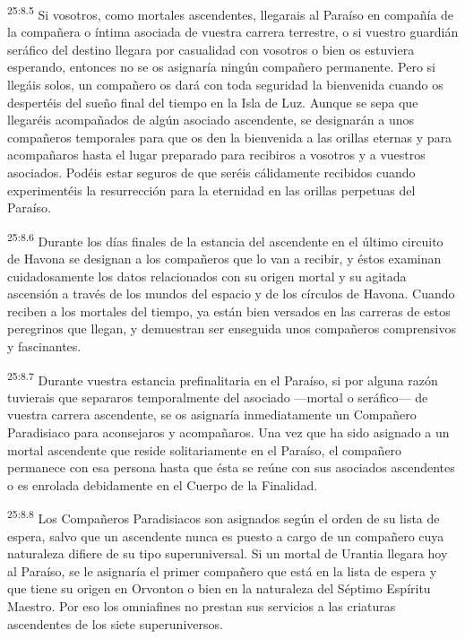 \par
\textsuperscript{25:8.5} Si vosotros, como mortales ascendentes, llegarais al Paraíso en compañía de la compañera o íntima asociada de vuestra carrera terrestre, o si vuestro guardián seráfico del destino llegara por casualidad con vosotros o bien os estuviera esperando, entonces no se os asignaría ningún compañero permanente. Pero si llegáis solos, un compañero os dará con toda seguridad la bienvenida cuando os despertéis del sueño final del tiempo en la Isla de Luz. Aunque se sepa que llegaréis acompañados de algún asociado ascendente, se designarán a unos compañeros temporales para que os den la bienvenida a las orillas eternas y para acompañaros hasta el lugar preparado para recibiros a vosotros y a vuestros asociados. Podéis estar seguros de que seréis cálidamente recibidos cuando experimentéis la resurrección para la eternidad en las orillas perpetuas del Paraíso.

\par
\textsuperscript{25:8.6} Durante los días finales de la estancia del ascendente en el último circuito de Havona se designan a los compañeros que lo van a recibir, y éstos examinan cuidadosamente los datos relacionados con su origen mortal y su agitada ascensión a través de los mundos del espacio y de los círculos de Havona. Cuando reciben a los mortales del tiempo, ya están bien versados en las carreras de estos peregrinos que llegan, y demuestran ser enseguida unos compañeros comprensivos y fascinantes.

\par
\textsuperscript{25:8.7} Durante vuestra estancia prefinalitaria en el Paraíso, si por alguna razón tuvierais que separaros temporalmente del asociado ---mortal o seráfico--- de vuestra carrera ascendente, se os asignaría inmediatamente un Compañero Paradisiaco para aconsejaros y acompañaros. Una vez que ha sido asignado a un mortal ascendente que reside solitariamente en el Paraíso, el compañero permanece con esa persona hasta que ésta se reúne con sus asociados ascendentes o es enrolada debidamente en el Cuerpo de la Finalidad.

\par
\textsuperscript{25:8.8} Los Compañeros Paradisiacos son asignados según el orden de su lista de espera, salvo que un ascendente nunca es puesto a cargo de un compañero cuya naturaleza difiere de su tipo superuniversal. Si un mortal de Urantia llegara hoy al Paraíso, se le asignaría el primer compañero que está en la lista de espera y que tiene su origen en Orvonton o bien en la naturaleza del Séptimo Espíritu Maestro. Por eso los omniafines no prestan sus servicios a las criaturas ascendentes de los siete superuniversos.

